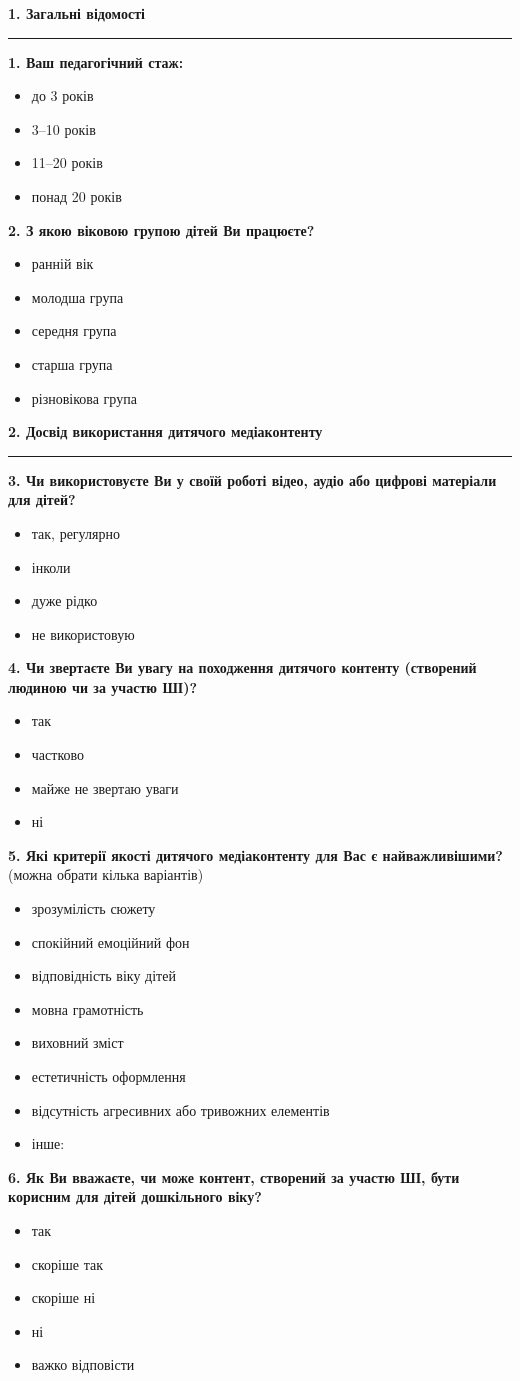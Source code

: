 \documentclass[12pt,a4paper]{article}
\newcommand{\midruleline}{%
    {\color{linegray}\rule{\linewidth}{0.6pt}}
}
\newcommand{\formsection}[1]{%
    \vspace{0.8em}
    {\large\bfseries\color{main} #1}\par
    \vspace{0.35em}
    \midruleline
    \vspace{0.45em}
}
\newcommand{\checkboxitem}[1]{\item[□] #1}
\begin{document}
\formsection{1. Загальні відомості}

\textbf{1. Ваш педагогічний стаж:}
\begin{itemize}[leftmargin=1.5cm, itemsep=2pt, topsep=4pt]
    \checkboxitem{до 3 років}
    \checkboxitem{3--10 років}
    \checkboxitem{11--20 років}
    \checkboxitem{понад 20 років}
\end{itemize}

\textbf{2. З якою віковою групою дітей Ви працюєте?}
\begin{itemize}[leftmargin=1.5cm, itemsep=2pt, topsep=4pt]
    \checkboxitem{ранній вік}
    \checkboxitem{молодша група}
    \checkboxitem{середня група}
    \checkboxitem{старша група}
    \checkboxitem{різновікова група}
\end{itemize}

\formsection{2. Досвід використання дитячого медіаконтенту}

\textbf{3. Чи використовуєте Ви у своїй роботі відео, аудіо або цифрові матеріали для дітей?}
\begin{itemize}[leftmargin=1.5cm, itemsep=2pt, topsep=4pt]
    \checkboxitem{так, регулярно}
    \checkboxitem{інколи}
    \checkboxitem{дуже рідко}
    \checkboxitem{не використовую}
\end{itemize}

\textbf{4. Чи звертаєте Ви увагу на походження дитячого контенту (створений людиною чи за участю ШІ)?}
\begin{itemize}[leftmargin=1.5cm, itemsep=2pt, topsep=4pt]
    \checkboxitem{так}
    \checkboxitem{частково}
    \checkboxitem{майже не звертаю уваги}
    \checkboxitem{ні}
\end{itemize}

\textbf{5. Які критерії якості дитячого медіаконтенту для Вас є найважливішими?}
{\small\color{textgray}(можна обрати кілька варіантів)}
\begin{itemize}[leftmargin=1.5cm, itemsep=2pt, topsep=4pt]
    \checkboxitem{зрозумілість сюжету}
    \checkboxitem{спокійний емоційний фон}
    \checkboxitem{відповідність віку дітей}
    \checkboxitem{мовна грамотність}
    \checkboxitem{виховний зміст}
    \checkboxitem{естетичність оформлення}
    \checkboxitem{відсутність агресивних або тривожних елементів}
    \checkboxitem{інше: \hrulefill}
\end{itemize}

\textbf{6. Як Ви вважаєте, чи може контент, створений за участю ШІ, бути корисним для дітей дошкільного віку?}
\begin{itemize}[leftmargin=1.5cm, itemsep=2pt, topsep=4pt]
    \checkboxitem{так}
    \checkboxitem{скоріше так}
    \checkboxitem{скоріше ні}
    \checkboxitem{ні}
    \checkboxitem{важко відповісти}
\end{itemize}
\end{document}
